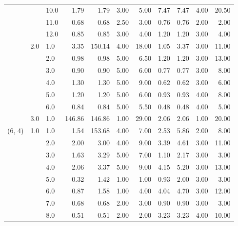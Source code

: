 \begin{tabular}{lllrrrrrrrr}
       &     & 10.0 &       1.79 &      1.79 &  3.00 &   5.00 &       7.47 &      7.47 &  4.00 &  20.50 \\
       &     & 11.0 &       0.68 &      0.68 &  2.50 &   3.00 &       0.76 &      0.76 &  2.00 &   2.00 \\
       &     & 12.0 &       0.85 &      0.85 &  3.00 &   4.00 &       1.20 &      1.20 &  3.00 &   4.00 \\
       & 2.0 & 1.0  &       3.35 &    150.14 &  4.00 &  18.00 &       1.05 &      3.37 &  3.00 &  11.00 \\
       &     & 2.0  &       0.98 &      0.98 &  5.00 &   6.50 &       1.20 &      1.20 &  3.00 &  13.00 \\
       &     & 3.0  &       0.90 &      0.90 &  5.00 &   6.00 &       0.77 &      0.77 &  3.00 &   8.00 \\
       &     & 4.0  &       1.30 &      1.30 &  5.00 &   9.00 &       0.62 &      0.62 &  3.00 &   6.00 \\
       &     & 5.0  &       1.20 &      1.20 &  5.00 &   6.00 &       0.93 &      0.93 &  4.00 &   8.00 \\
       &     & 6.0  &       0.84 &      0.84 &  5.00 &   5.50 &       0.48 &      0.48 &  4.00 &   5.00 \\
       & 3.0 & 1.0  &     146.86 &    146.86 &  1.00 &  29.00 &       2.06 &      2.06 &  1.00 &  20.00 \\
(6, 4) & 1.0 & 1.0  &       1.54 &    153.68 &  4.00 &   7.00 &       2.53 &      5.86 &  2.00 &   8.00 \\
       &     & 2.0  &       2.00 &      3.00 &  4.00 &   9.00 &       3.39 &      4.61 &  3.00 &  11.00 \\
       &     & 3.0  &       1.63 &      3.29 &  5.00 &   7.00 &       1.10 &      2.17 &  3.00 &   3.00 \\
       &     & 4.0  &       2.06 &      3.37 &  5.00 &   9.00 &       4.15 &      5.20 &  3.00 &  13.00 \\
       &     & 5.0  &       0.32 &      1.42 &  1.00 &   1.00 &       0.93 &      2.00 &  3.00 &   3.00 \\
       &     & 6.0  &       0.87 &      1.58 &  1.00 &   4.00 &       4.04 &      4.70 &  3.00 &  12.00 \\
       &     & 7.0  &       0.68 &      0.68 &  2.00 &   3.00 &       0.90 &      0.90 &  3.00 &   3.00 \\
       &     & 8.0  &       0.51 &      0.51 &  2.00 &   2.00 &       3.23 &      3.23 &  4.00 &  10.00 \\

\end{tabular}
